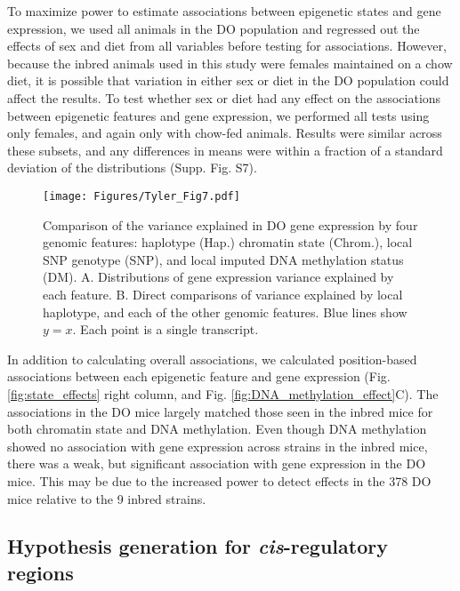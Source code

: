 \documentclass[
  11pt,
]{article}
\begin{document}
To maximize power to estimate associations between epigenetic states and
gene expression, we used all animals in the DO population and regressed
out the effects of sex and diet from all variables before testing for
associations. However, because the inbred animals used in this study
were females maintained on a chow diet, it is possible that variation in
either sex or diet in the DO population could affect the results. To
test whether sex or diet had any effect on the associations between
epigenetic features and gene expression, we performed all tests using
only females, and again only with chow-fed animals. Results were similar
across these subsets, and any differences in means were within a
fraction of a standard deviation of the distributions (Supp. Fig. S7).

\begin{figure}[ht!]
\texttt{[image: Figures/Tyler\_Fig7.pdf]} 
\caption{Comparison of the variance explained in DO gene expression
by four genomic features: haplotype (Hap.) chromatin state (Chrom.), 
local SNP genotype (SNP), and local imputed DNA methylation status 
(DM). A. Distributions of gene expression variance explained by each 
feature. B. Direct comparisons of variance explained by local 
haplotype, and each of the other genomic features. Blue lines 
show $y = x$. Each point is a single transcript.}
\label{fig:effect_distrubutions}
\end{figure}

In addition to calculating overall associations, we calculated
position-based associations between each epigenetic feature and gene
expression (Fig. \ref{fig:state_effects} right column, and Fig.
\ref{fig:DNA_methylation_effect}C). The associations in the DO mice
largely matched those seen in the inbred mice for both chromatin state
and DNA methylation. Even though DNA methylation showed no association
with gene expression across strains in the inbred mice, there was a
weak, but significant association with gene expression in the DO mice.
This may be due to the increased power to detect effects in the 378 DO
mice relative to the 9 inbred strains.

\hypertarget{hypothesis-generation-for--regulatory-regions}{%
\subsection{\texorpdfstring{Hypothesis generation for
\textit{cis}-regulatory
regions}{Hypothesis generation for -regulatory regions}}\label{hypothesis-generation-for--regulatory-regions}}
\end{document}
